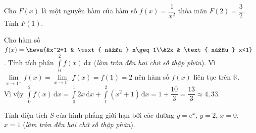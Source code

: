\begin{ex}%
	Cho $F(x)$ là một nguyên hàm của hàm số $f(x)=\dfrac{1}{x^2}$ thỏa mãn $F(2)=\dfrac{3}{2}$. Tính $F(1)$.
\end{ex}
\begin{ex}%
	Cho hàm số $f(x)=\heva{&x^2+1 & \text{ nếu } x\geq 1\\&2x & \text{ nếu } x<1}$. Tính tích phân $\displaystyle\int\limits_0^2 f(x)\mathrm{\,d}x$ (\textit{làm tròn đến hai chữ số thập phân}).
	\loigiai
	{Vì $\lim\limits_{x \to 1^+} f(x) = \lim\limits_{x \to 1^-} f(x)=f(1)=2$ nên hàm số $f(x)$ liên tục trên $\mathbb{R}$.\\
	Vì vậy $\displaystyle\int\limits_0^2 f(x)\mathrm{\,d}x = \displaystyle\int\limits_0^1 2x\mathrm{\,d}x + \displaystyle\int\limits_1^2 \left(x^2+1\right)\mathrm{\,d}x =1+ \dfrac{10}{3} = \dfrac{13}{3}\approx 4{,}33$.}
\end{ex}
\begin{ex}%
	Tính diện tích $S$ của hình phẳng giới hạn bởi các đường $y=\mathrm{e}^x$, $y=2$, $x=0$, $x=1$ (\textit{làm tròn đến hai chữ số thập phân}).
\end{ex}
